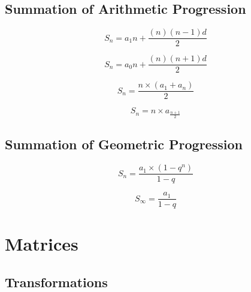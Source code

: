 \documentclass[a4paper,9pt]{scrartcl}
\begin{document}
    \subsection{Summation of Arithmetic Progression}

    \begin{displaymath}
        S_n = {a_1}n + \frac{(n)(n-1)d}{2}
    \end{displaymath}

    \begin{displaymath}
        S_n = {a_0}n + \frac{(n)(n+1)d}{2}
    \end{displaymath}

    \begin{displaymath}
        S_n = \frac{n\times(a_1+a_n)}{2}
    \end{displaymath}

    \begin{displaymath}
        S_n = n{\times}a_{\frac{n+1}{2}}
    \end{displaymath}

    \subsection{Summation of Geometric Progression}

    \begin{displaymath}
        S_n = \frac{a_1\times(1-q^n)}{1-q}
    \end{displaymath}

    \begin{displaymath}
        S_\infty = \frac{a_1}{1-q}
    \end{displaymath}


    \section{Matrices}

    \subsection{Transformations}
\end{document}
